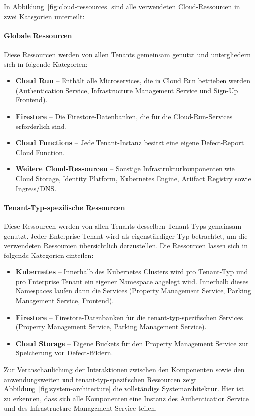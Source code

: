 In Abbildung~\ref{fig:cloud-ressources} sind alle verwendeten Cloud-Ressourcen in zwei Kategorien unterteilt:
\paragraph{Globale Ressourcen}
Diese Ressourcen werden von allen Tenants gemeinsam genutzt und untergliedern sich in folgende Kategorien:
\begin{itemize}
	\item \textbf{Cloud Run} – Enthält alle Microservices, die in Cloud Run betrieben werden (Authentication Service, Infrastructure Management Service und Sign-Up Frontend).
	\item \textbf{Firestore} – Die Firestore-Datenbanken, die für die Cloud-Run-Services erforderlich sind.
	\item \textbf{Cloud Functions} – Jede Tenant-Instanz besitzt eine eigene Defect-Report Cloud Function.
	\item \textbf{Weitere Cloud-Ressourcen} – Sonstige Infrastrukturkomponenten wie Cloud Storage, Identity Platform, Kubernetes Engine, Artifact Registry sowie Ingress/DNS.
\end{itemize}

\paragraph{Tenant-Typ-spezifische Ressourcen}
Diese Ressourcen werden von allen Tenants desselben Tenant-Typs gemeinsam genutzt. Jeder Enterprise-Tenant wird als eigenständiger Typ betrachtet, um die verwendeten Ressourcen übersichtlich darzustellen. Die Ressourcen lassen sich in folgende Kategorien einteilen:
\begin{itemize}
	\item \textbf{Kubernetes} – Innerhalb des Kubernetes Clusters wird pro Tenant-Typ und pro Enterprise Tenant ein eigener Namespace angelegt wird. 
  Innerhalb dieses Namespaces laufen dann die Services (Property Management Service, Parking Management Service, Frontend).
	\item \textbf{Firestore} – Firestore-Datenbanken für die tenant-typ-spezifischen Services (Property Management Service, Parking Management Service).
	\item \textbf{Cloud Storage} – Eigene Buckets für den Property Management Service zur Speicherung von Defect-Bildern.
\end{itemize}

Zur Veranschaulichung der Interaktionen zwischen den Komponenten sowie den anwendungsweiten und tenant-typ-spezifischen Ressourcen zeigt Abbildung~\ref{fig:system-architecture} die vollständige Systemarchitektur. Hier ist zu erkennen, dass sich alle Komponenten eine Instanz des Authentication Service und des Infrastructure Management Service teilen.

